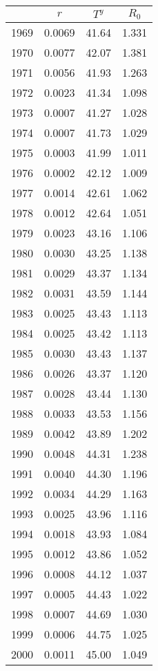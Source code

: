 \begin{tabular}{cccc}
  \hline
 & $r$ & $T^y$ & $R_0$ \\ 
  \hline
1969 & 0.0069 & 41.64 & 1.331 \\ 
  1970 & 0.0077 & 42.07 & 1.381 \\ 
  1971 & 0.0056 & 41.93 & 1.263 \\ 
  1972 & 0.0023 & 41.34 & 1.098 \\ 
  1973 & 0.0007 & 41.27 & 1.028 \\ 
  1974 & 0.0007 & 41.73 & 1.029 \\ 
  1975 & 0.0003 & 41.99 & 1.011 \\ 
  1976 & 0.0002 & 42.12 & 1.009 \\ 
  1977 & 0.0014 & 42.61 & 1.062 \\ 
  1978 & 0.0012 & 42.64 & 1.051 \\ 
  1979 & 0.0023 & 43.16 & 1.106 \\ 
  1980 & 0.0030 & 43.25 & 1.138 \\ 
  1981 & 0.0029 & 43.37 & 1.134 \\ 
  1982 & 0.0031 & 43.59 & 1.144 \\ 
  1983 & 0.0025 & 43.43 & 1.113 \\ 
  1984 & 0.0025 & 43.42 & 1.113 \\ 
  1985 & 0.0030 & 43.43 & 1.137 \\ 
  1986 & 0.0026 & 43.37 & 1.120 \\ 
  1987 & 0.0028 & 43.44 & 1.130 \\ 
  1988 & 0.0033 & 43.53 & 1.156 \\ 
  1989 & 0.0042 & 43.89 & 1.202 \\ 
  1990 & 0.0048 & 44.31 & 1.238 \\ 
  1991 & 0.0040 & 44.30 & 1.196 \\ 
  1992 & 0.0034 & 44.29 & 1.163 \\ 
  1993 & 0.0025 & 43.96 & 1.116 \\ 
  1994 & 0.0018 & 43.93 & 1.084 \\ 
  1995 & 0.0012 & 43.86 & 1.052 \\ 
  1996 & 0.0008 & 44.12 & 1.037 \\ 
  1997 & 0.0005 & 44.43 & 1.022 \\ 
  1998 & 0.0007 & 44.69 & 1.030 \\ 
  1999 & 0.0006 & 44.75 & 1.025 \\ 
  2000 & 0.0011 & 45.00 & 1.049 \\ 

\end{tabular}
